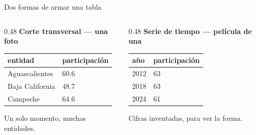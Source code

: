\begin{frame}{Dos formas de armar una tabla}
  \vspace{0.2em}
  \small
  \begin{columns}[T]
    \begin{column}{0.48\textwidth}
      \textbf{Corte transversal — una foto}
      \begin{tabular}{@{}ll@{}}
        \toprule
        entidad & participación \\
        \midrule
        Aguascalientes & 60.6 \\
        Baja California & 48.7 \\
        Campeche & 64.6 \\
        \bottomrule
      \end{tabular}
      \vspace{0.4em}

      {\footnotesize\color{grisTenue}Un solo momento, muchas entidades.}
    \end{column}
    \begin{column}{0.48\textwidth}
      \textbf{Serie de tiempo — película de una}
      \begin{tabular}{@{}ll@{}}
        \toprule
        año & participación \\
        \midrule
        2012 & 63 \\
        2018 & 63 \\
        2024 & 61 \\
        \bottomrule
      \end{tabular}
      \vspace{0.4em}

      {\footnotesize\color{grisTenue}Cifras inventadas, para ver la forma.}
    \end{column}
  \end{columns}
\end{frame}

